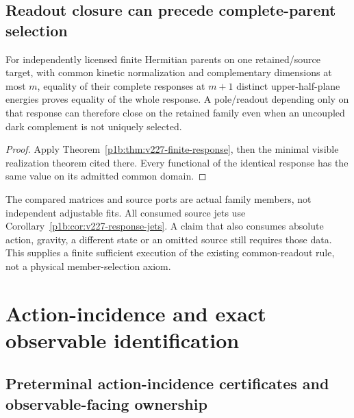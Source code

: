 \documentclass[12pt,a4paper]{article}
\begin{document}
\subsection{Readout closure can precede complete-parent selection}
\label{p2a:sec:v227-visible-closure}
\begin{corollary}
\label{p2a:cor:v227-visible-closure}
For independently licensed finite Hermitian parents on one retained/source
target, with common kinetic normalization and complementary dimensions at
most $m$, equality of their complete responses at $m+1$ distinct upper-half-plane
energies proves equality of the whole response. A pole/readout depending
only on that response can therefore close on the retained family even when
an uncoupled dark complement is not uniquely selected.
\end{corollary}
\begin{proof}
Apply Theorem~\ref{p1b:thm:v227-finite-response}, then the minimal visible
realization theorem cited there. Every functional of the identical response
has the same value on its admitted common domain.
\end{proof}
The compared matrices and source ports are actual family members, not
independent adjustable fits. All consumed source jets use
Corollary~\ref{p1b:cor:v227-response-jets}. A claim that also consumes
absolute action, gravity, a different state or an omitted source still
requires those data. This supplies a finite sufficient execution of the
existing common-readout rule, not a physical member-selection axiom.




\section{Action-incidence and exact observable identification}
\label{p2a:sec:clean-action-certificates}
\subsection{Preterminal action-incidence certificates and observable-facing ownership}
\label{p2a:sec:v229-action-incidence}
\end{document}
